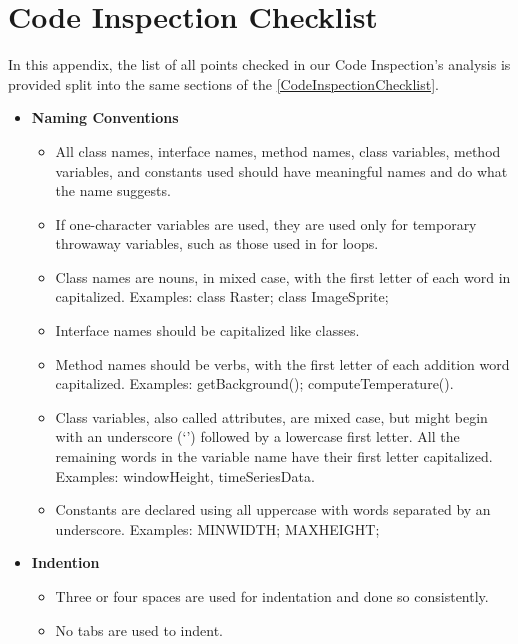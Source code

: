 \documentclass[\mainpath/main]{subfiles}
\begin{document}
	
	\chapter{Code Inspection Checklist} %
	\label{AppendixA:CodeInspectionChecklist}
	
	\setmyfancystyle
	
	In this appendix, the list of all points checked in our Code Inspection's analysis is provided split into the same sections of the \autoref{CodeInspectionChecklist}.\\
	
	\begin{itemize}
		\item \textbf{Naming Conventions}
		\begin{itemize}
			\item {All class names, interface names, method names, class variables, method variables, and constants used should have meaningful names and do what the name suggests.}
			\item {If one-character variables are used, they are used only for temporary throwaway variables, such as those used in for loops.}
			\item Class names are nouns, in mixed case, with the first letter of each word in capitalized. Examples: class Raster; class ImageSprite;
			\item Interface names should be capitalized like classes.
			\item Method names should be verbs, with the first letter of each addition word
             capitalized. Examples: getBackground(); computeTemperature().
            \item Class variables, also called attributes, are mixed case, but might begin with an underscore (\textquoteleft \textunderscore \textquoteright) followed by a lowercase first letter. All the remaining words in the variable name have their first letter capitalized. Examples: \textunderscore windowHeight, timeSeriesData.
			\item Constants are declared using all uppercase with words separated by an             underscore. Examples: MIN\textunderscore WIDTH; MAX\textunderscore HEIGHT;
		\end{itemize}
		
		\item \textbf{Indention}
		\begin{itemize}
			\item Three or four spaces are used for indentation and done so consistently.
			\item No tabs are used to indent.
		\end{itemize}
		

\end{itemize}
\end{document}
